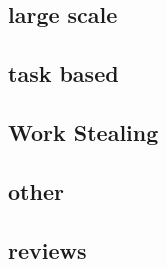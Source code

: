 \documentclass{article}
\begin{document}
\subsection{large scale}

\cite{PEARCE2017}
\cite{BERLINSKA201814}
\cite{8017633}
\cite{DEVINE2005133}
\cite{javataskpool}
\cite{barat:tel-01672546}



\subsection{task based}

\cite{CPE:CPE1631}
\cite{Bhatti2017}
\cite{5599103}
\cite{Posner2018}
\cite{CCGrid2018}
\cite{8025281}
\cite{7307597}
\cite{Galvez:2017:ATM:3079079.3079104} %


\subsection{Work Stealing}
\cite{Yang2017}
\cite{Chen:2015:LWS:2775085.2766450}
\cite{Blumofe:1999:SMC:324133.324234}
\cite{Cilk}
\cite{Saraswat:2011:LGL:1941553.1941582}

\subsection{other}

\cite{Gao:2017:MPL:3110224.3110240}
\cite{CAMPOS20001213}
\cite{PINAR2004974}
\cite{7551381}
\cite{Menon:2013:DDL:2503210.2503284}
\cite{Liu:2017}
\cite{SEVERIUKHINA2017139}
\cite{7965131}


\subsection{reviews}

\cite{Teresco_2partitioning}

\printbibliography
\end{document}
